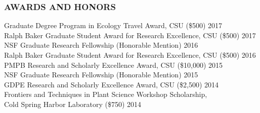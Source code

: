 \documentclass[12pt,english]{article}
\begin{document}
\subsubsection*{AWARDS AND HONORS}
\vspace{-0.5ex}
\hspace*{1.0em} Graduate Degree Program in Ecology Travel Award, CSU (\$500)
\hfill 
2017
\vspace{1ex}\\
\hspace*{1.0em} Ralph Baker Graduate Student Award for Research Excellence, CSU (\$500)
\hfill 
2017
\vspace{1ex}\\
\hspace*{1.0em} NSF Graduate Research Fellowship (Honorable Mention)
\hfill 
2016
\vspace{1ex}\\
\hspace*{1.0em} Ralph Baker Graduate Student Award for Research Excellence, CSU (\$500)
\hfill 
2016
\vspace{1ex}\\
\hspace*{1.0em} PMPB Research and Scholarly Excellence Award, CSU (\$10,000)
\hfill 
2015
\vspace{1ex}\\
\hspace*{1.0em} NSF Graduate Research Fellowship (Honorable Mention)
\hfill 
2015
\vspace{1ex}\\
\hspace*{1.0em} GDPE Research and Scholarly Excellence Award, CSU (\$2,500)
\hfill 
2014
\vspace{1ex}\\
\hspace*{1.0em}  Frontiers and Techniques in Plant Science Workshop Scholarship,\\ 
\hspace*{1.0em} Cold Spring Harbor Laboratory   (\$750)
\hfill 
2014
\vspace{1ex}


\end{document}

